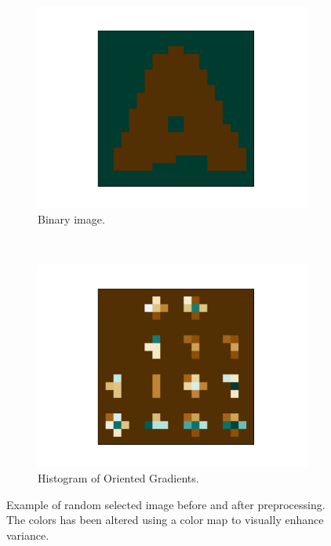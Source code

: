\documentclass[../main.tex]{subfiles}
\begin{document}
\begin{figure}
    ~ %
    \begin{subfigure}[b]{0.48\textwidth}
        \includegraphics[width=\textwidth]{figures/pp/img_to_bool.pdf}
        \caption{Binary image.}
        \label{fig:bool}
    \end{subfigure}
        ~ %
    \begin{subfigure}[b]{0.48\textwidth}
        \includegraphics[width=\textwidth]{figures/pp/hog.pdf}
        \caption{Histogram of Oriented Gradients.}
        \label{fig:hog}
    \end{subfigure}
    \caption{Example of random selected image before and after preprocessing. The colors has been altered using a color map to visually enhance variance.}\label{fig:pp_image}
\end{figure}
\end{document}
